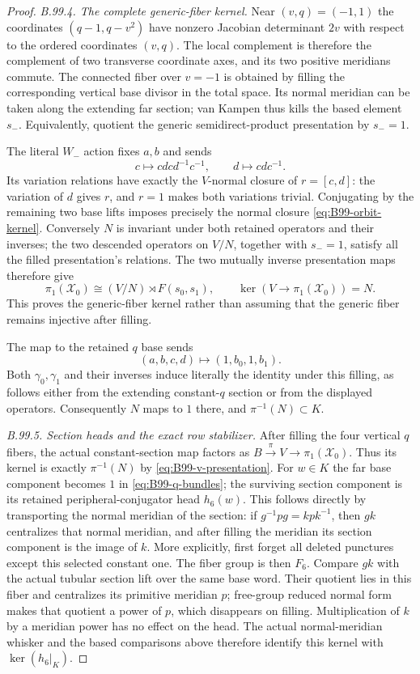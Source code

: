 \begin{proof}
\emph{B.99.4. The complete generic-fiber kernel.}
Near $(v,q)=(-1,1)$ the coordinates
$(q-1,q-v^2)$ have nonzero Jacobian determinant $2v$
with respect to the ordered coordinates $(v,q)$.
The local complement is therefore the complement of two transverse
coordinate axes, and its two positive meridians commute.
The connected fiber over $v=-1$ is obtained by filling the corresponding
vertical base divisor in the total space.
Its normal meridian can be taken along the extending far section;
van Kampen thus kills the based element $s_-$.
Equivalently, quotient the generic semidirect-product presentation
by $s_-=1$.

The literal $W_-$ action fixes $a,b$ and sends
\[
 c\longmapsto cdc d^{-1}c^{-1},\qquad
 d\longmapsto cdc^{-1}.
\]
Its variation relations have exactly the $V$-normal closure of
$r=[c,d]$: the variation of $d$ gives $r$, and $r=1$ makes both
variations trivial.
Conjugating by the remaining two base lifts imposes precisely the
normal closure \eqref{eq:B99-orbit-kernel}.
Conversely $N$ is invariant under both retained operators and their
inverses; the two descended operators on $V/N$, together with
$s_-=1$, satisfy all the filled presentation's relations.
The two mutually inverse presentation maps therefore give
\begin{equation}\label{eq:B99-v-presentation}
 \pi_1(\mathscr X_0)\cong (V/N)\rtimes F(s_0,s_1),
 \qquad \ker(V\to\pi_1(\mathscr X_0))=N.
\end{equation}
This proves the generic-fiber kernel rather than assuming that
the generic fiber remains injective after filling.

The map to the retained $q$ base sends
\[
 (a,b,c,d)\longmapsto(1,b_0,1,b_1).
\]
Both $\gamma_0,\gamma_1$ and their inverses induce literally the
identity under this filling, as follows either from the extending
constant-$q$ section or from the displayed operators.
Consequently $N$ maps to $1$ there, and $\pi^{-1}(N)\subset K$.

\emph{B.99.5. Section heads and the exact row stabilizer.}
After filling the four vertical $q$ fibers, the actual constant-section
map factors as $B\xrightarrow{\pi}V\to\pi_1(\mathscr X_0)$.
Thus its kernel is exactly $\pi^{-1}(N)$ by
\eqref{eq:B99-v-presentation}.
For $w\in K$ the far base component becomes $1$ in
\eqref{eq:B99-q-bundles}; the surviving section component is its
retained peripheral-conjugator head $h_6(w)$.
This follows directly by transporting the normal meridian of the
section: if $g^{-1}pg=kpk^{-1}$, then $gk$ centralizes that
normal meridian, and after filling the meridian its section component
is the image of $k$.
More explicitly, first forget all deleted punctures except this selected
constant one.  The fiber group is then $F_6$.  Compare $gk$ with the
actual tubular section lift over the same base word.  Their quotient
lies in this fiber and centralizes its primitive meridian $p$;
free-group reduced normal form makes that quotient a power of $p$,
which disappears on filling.
Multiplication of $k$ by a meridian power has no effect on the head.
The actual normal-meridian whisker and the based comparisons above
therefore identify this kernel with $\ker(h_6|_K)$.


\end{proof}

